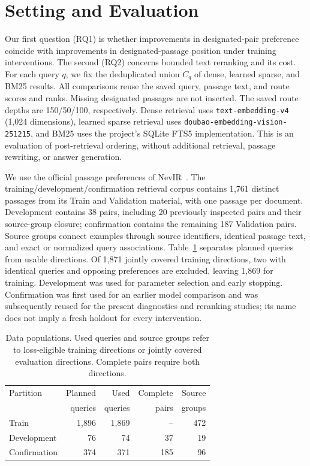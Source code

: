 \section{Setting and Evaluation}
\label{sec:setting}

Our first question (RQ1) is whether improvements in designated-pair preference coincide with improvements in designated-passage position under training interventions. The second (RQ2) concerns bounded text reranking and its cost. For each query $q$, we fix the deduplicated union $C_q$ of dense, learned sparse, and BM25 results. All comparisons reuse the saved query, passage text, and route scores and ranks. Missing designated passages are not inserted. The saved route depths are 150/50/100, respectively. Dense retrieval uses \texttt{text-embedding-v4} (1,024 dimensions), learned sparse retrieval uses \texttt{doubao-embedding-}\allowbreak\texttt{vision-251215}, and BM25 uses the project's SQLite FTS5 implementation. This is an evaluation of post-retrieval ordering, without additional retrieval, passage rewriting, or answer generation.

We use the official passage preferences of NevIR~\cite{weller-etal-2024-nevir}. The training/development/confirmation retrieval corpus contains 1,761 distinct passages from its Train and Validation material, with one passage per document. Development contains 38 pairs, including 20 previously inspected pairs and their source-group closure; confirmation contains the remaining 187 Validation pairs. Source groups connect examples through source identifiers, identical passage text, and exact or normalized query associations. Table~\ref{tab:populations} separates planned queries from usable directions. Of 1,871 jointly covered training directions, two with identical queries and opposing preferences are excluded, leaving 1,869 for training. Development was used for parameter selection and early stopping. Confirmation was first used for an earlier model comparison and was subsequently reused for the present diagnostics and reranking studies; its name does not imply a fresh holdout for every intervention.

\begin{table}[t]
\centering
\caption{Data populations. Used queries and source groups refer to loss-eligible training directions or jointly covered evaluation directions. Complete pairs require both directions.}
\label{tab:populations}
\small
\begin{tabular}{lrrrr}
\toprule
Partition & Planned & Used & Complete & Source\\
 & queries & queries & pairs & groups\\
\midrule
Train & 1,896 & 1,869 & -- & 472\\
Development & 76 & 74 & 37 & 19\\
Confirmation & 374 & 371 & 185 & 96\\
\bottomrule
\end{tabular}
\end{table}

